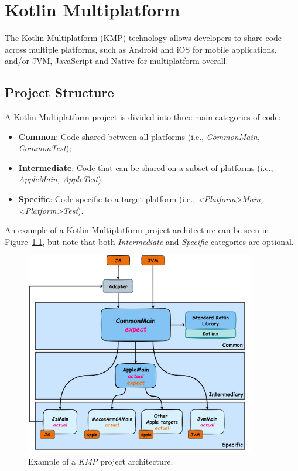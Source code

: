\chapter{Kotlin Multiplatform}\label{ch:kotlin-multiplatform}

The Kotlin Multiplatform (KMP) technology allows developers to share code across multiple platforms, such as Android and iOS for mobile applications, and/or JVM, JavaScript and Native for multiplatform overall.


\section{Project Structure}\label{sec:project-structure}

A Kotlin Multiplatform project is divided into three main categories of code:

\begin{itemize}
    \item \textbf{Common}: Code shared between all platforms (i.e., \textit{CommonMain, CommonTest});
    \item \textbf{Intermediate}: Code that can be shared on a subset of platforms (i.e., \textit{AppleMain, AppleTest});
    \item \textbf{Specific}: Code specific to a target platform (i.e., \textit{\textless Platform\textgreater Main, \textless Platform\textgreater Test}).
\end{itemize}


An example of a Kotlin Multiplatform project architecture can be seen in Figure~\ref{fig:kmp-architecture}, but note that both \textit{Intermediate} and \textit{Specific} categories are optional.

\begin{figure}[!htb]
    \centering
    \caption{Example of a \textit{KMP} project architecture.}
    \label{fig:kmp-architecture}
    \vspace{0.3cm}
    \includegraphics[width=0.9\textwidth]{../figures/02_kmp-architecture}
\end{figure}

